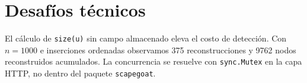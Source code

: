 \section{Desafíos técnicos}

El cálculo de \texttt{size(u)} sin campo almacenado eleva el costo de detección. Con $n=1000$ e inserciones ordenadas observamos 375 reconstrucciones y 9762 nodos reconstruidos acumulados. La concurrencia se resuelve con \texttt{sync.Mutex} en la capa HTTP, no dentro del paquete \texttt{scapegoat}.
